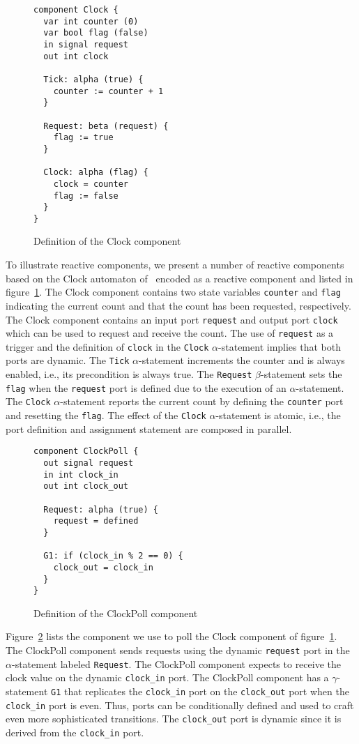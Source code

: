 \begin{figure}
\begin{verbatim}
component Clock {
  var int counter (0)
  var bool flag (false)
  in signal request
  out int clock

  Tick: alpha (true) {
    counter := counter + 1
  }

  Request: beta (request) {
    flag := true
  }

  Clock: alpha (flag) {
    clock = counter
    flag := false
  }
}
\end{verbatim}
\caption{Definition of the Clock component\label{clock_component}}
\end{figure}

To illustrate reactive components, we present a number of reactive components based on the Clock automaton of~\cite{nancy1996distributed} encoded as a reactive component and listed in figure~\ref{clock_component}.
The Clock component contains two state variables \verb+counter+ and \verb+flag+ indicating the current count and that the count has been requested, respectively.
The Clock component contains an input port \verb+request+ and output port \verb+clock+ which can be used to request and receive the count.
The use of \verb+request+ as a trigger and the definition of \verb+clock+ in the \verb+Clock+ $\alpha$-statement implies that both ports are dynamic.
The \verb+Tick+ $\alpha$-statement increments the counter and is always enabled, i.e., its precondition is always true.
The \verb+Request+ $\beta$-statement sets the \verb+flag+ when the \verb+request+ port is defined due to the execution of an $\alpha$-statement.
The \verb+Clock+ $\alpha$-statement reports the current count by defining the \verb+counter+ port and resetting the \verb+flag+.
The effect of the \verb+Clock+ $\alpha$-statement is atomic, i.e., the port definition and assignment statement are composed in parallel.

\begin{figure}
\begin{verbatim}
component ClockPoll {
  out signal request
  in int clock_in
  out int clock_out
  
  Request: alpha (true) {
    request = defined
  }

  G1: if (clock_in % 2 == 0) {
    clock_out = clock_in
  }
}
\end{verbatim}
\caption{Definition of the ClockPoll component\label{clock_poll_component}}
\end{figure}

Figure~\ref{clock_poll_component} lists the component we use to poll the Clock component of figure~\ref{clock_component}.
The ClockPoll component sends requests using the dynamic \verb+request+ port in the $\alpha$-statement labeled \verb+Request+.
The ClockPoll component expects to receive the clock value on the dynamic \verb+clock_in+ port.
The ClockPoll component has a $\gamma$-statement \verb+G1+ that replicates the \verb+clock_in+ port on the \verb+clock_out+ port when the \verb+clock_in+ port is even.
Thus, ports can be conditionally defined and used to craft even more sophisticated transitions.
The \verb+clock_out+ port is dynamic since it is derived from the \verb+clock_in+ port.

